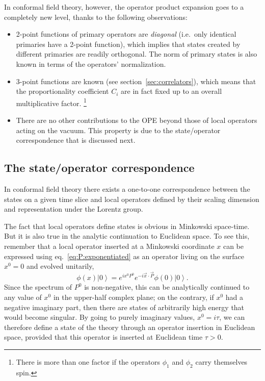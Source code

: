 \documentclass[a4paper,12pt]{article}
\newcommand{\ket}[1]{\left| #1 \right\rangle}
\numberwithin{equation}{section}
\begin{document}
In conformal field theory, however, the operator product expansion goes to a completely new level, thanks to the following observations:
%
\begin{itemize}

\item
2-point functions of primary operators are \emph{diagonal} (i.e.~only identical primaries have a 2-point function), which implies that states created by different primaries are readily orthogonal. The norm of primary states is also known in terms of the operators' normalization. 

\item
3-point functions are known (see section~\ref{sec:correlators}), which means that the proportionality coefficient $C_i$ are in fact fixed up to an overall multiplicative factor.%
%
\footnote{There is more than one factor if the operators $\phi_1$ and $\phi_2$ carry themselves spin.}
%

\item
There are no other contributions to the OPE beyond those of local operators acting on the vacuum. This property is due to the state/operator correspondence that is discussed next.

\end{itemize}
%

\subsection{The state/operator correspondence}

In conformal field theory there exists a one-to-one correspondence between the states on a given time slice and local operators defined by their scaling dimension and representation under the Lorentz group.

The fact that local operators define states is obvious in Minkowski space-time. But it is also true in the analytic continuation to Euclidean space. To see this, remember that a local operator inserted at a Minkowski coordinate $x$ can be expressed using eq.~\eqref{eq:P:exponentiated} as an operator living on the surface $x^0 = 0$ and evolved unitarily,
\begin{equation}
	\phi(x) \ket{0}
	= e^{i x^0 P^0} e^{-i \vec{x} \cdot \vec{P}} \phi(0) \ket{0}.
\end{equation}
Since the spectrum of $P^0$ is non-negative, this can be analytically continued to any value of $x^0$ in the upper-half complex plane; on the contrary, if $x^0$ had a negative imaginary part, then there are states of arbitrarily high energy that would become singular. 
By going to purely imaginary values, $x^0 = i \tau$, we can therefore define a state of the theory through an operator insertion in Euclidean space, provided that this operator is inserted at Euclidean time $\tau > 0$.
\end{document}
